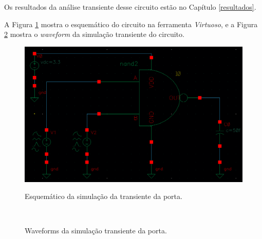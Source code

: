 \documentclass{iiufrgs}
\newcommand{\virtuoso}{\textit{Virtuoso}}
\begin{document}
\FloatBarrier

Os resultados da análise transiente desse circuito estão no Capítulo \ref{resultados}.\

A Figura \ref{fig:trans-nor} mostra o esquemático do circuito na ferramenta \virtuoso, e a Figura \ref{fig:wave-nor} mostra o \textit{waveform} da simulação transiente do circuito.\

\begin{figure}[htbp]
    \centering
    \caption{Esquemático da simulação da transiente da porta.}
    \includegraphics[scale=0.45]{images/new/schem_trans_nand.png}
    \label{fig:trans-nor}
\end{figure}

\begin{figure}[htbp]
    \centering
    \caption{Waveforms da simulação transiente da porta.}
     \\
    \label{fig:wave-nor}
\end{figure}
\end{document}
